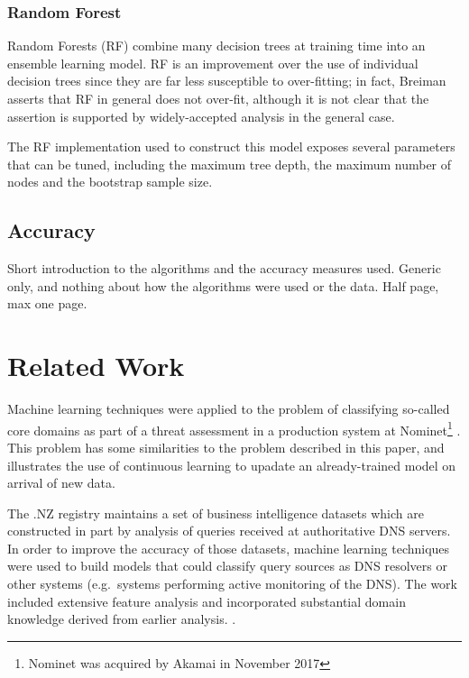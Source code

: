\documentclass[conference]{IEEEtran}
\let\citep\cite
\begin{document}
\subsubsection{Random Forest}\label{sec:random-forest}

Random Forests (RF) \citep{Breiman2001} combine many decision trees at
training time into an ensemble learning model. RF is an improvement over
the use of individual decision trees since they are far less susceptible
to over-fitting; in fact, Breiman asserts that RF in general does not
over-fit, although it is not clear that the assertion is supported by
widely-accepted analysis in the general case.

The RF implementation used to construct this model exposes several
parameters that can be tuned, including the maximum tree depth, the
maximum number of nodes and the bootstrap sample size.

\subsection{Accuracy}\label{sec:accuracy}

Short introduction to the algorithms and the accuracy measures used.
Generic only, and nothing about how the algorithms were used or the
data. Half page, max one page.

\section{Related Work}\label{sec:related-work}

\label{sec:related}

Machine learning techniques were applied to the problem of classifying
so-called core domains as part of a threat assessment in a production
system at
Nominet\footnote{Nominet was acquired by Akamai in November 2017}
\citep{Yuzifovichbotconf2017} \citep{YuzifovichOARC2017}. This problem
has some similarities to the problem described in this paper, and
illustrates the use of continuous learning to upadate an already-trained
model on arrival of new data.

The .NZ registry maintains a set of business intelligence datasets which
are constructed in part by analysis of queries received at authoritative
DNS servers. In order to improve the accuracy of those datasets, machine
learning techniques were used to build models that could classify query
sources as DNS resolvers or other systems (e.g.~systems performing
active monitoring of the DNS). The work included extensive feature
analysis and incorporated substantial domain knowledge derived from
earlier analysis. \citep{Qiao2018} \citep{QiaoOARC2018}.
\end{document}
